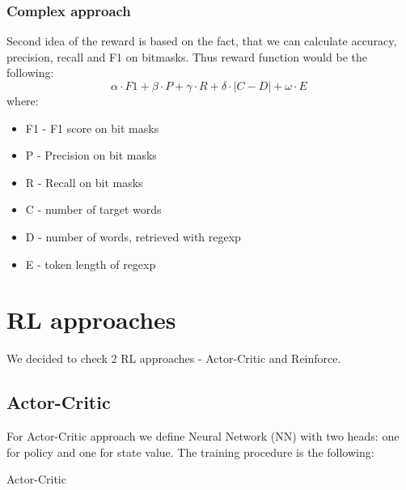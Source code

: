 \documentclass{article}
\begin{document}
\subsubsection{Complex approach}
Second idea of the reward is based on the fact, that we can calculate accuracy, precision, recall and F1 on bitmasks.
Thus reward function would be the following:
$$
\alpha \cdot F1 + \beta \cdot P + \gamma \cdot R + \delta \cdot |C - D| + \omega \cdot E\
$$
where:
\begin{itemize}
  \item F1 - F1 score on bit masks
  \item P - Precision on bit masks
  \item R - Recall on bit masks
  \item C - number of target words
  \item D - number of words, retrieved with regexp
  \item E - token length of regexp
\end{itemize}

\section{RL approaches}
We decided to check 2 RL approaches - Actor-Critic and Reinforce.

\subsection{Actor-Critic}
For Actor-Critic approach we define Neural Network (NN) with two heads: one for policy and one for state value.
The training procedure is the following:
\begin{algorithm}[H]

\caption{Actor-Critic}\label{algo:a2c}
\begin{algorithmic}[0]

  \EndWhile{}
  \State{$entropy_loss \gets \beta \cdot entropy$}
  

\end{algorithmic}
\end{algorithm}
\end{document}
